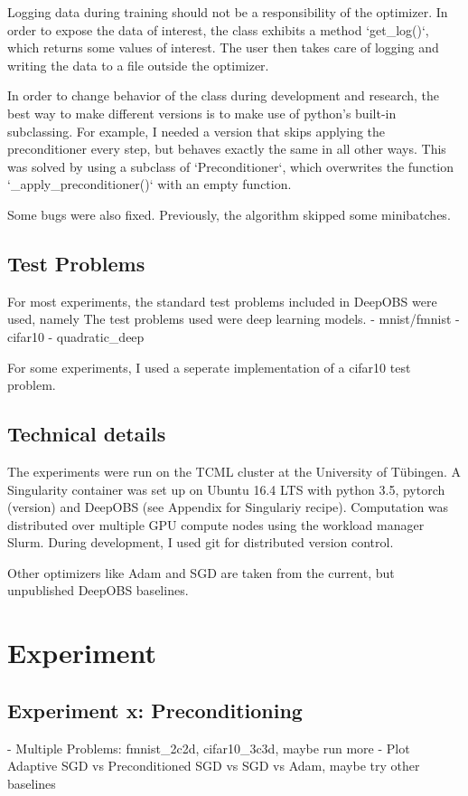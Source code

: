 \documentclass[twoside,12pt,a4paper]{report}
\begin{document}
\begin{markdown}
Logging data during training should not be a responsibility of the optimizer. In order to expose the data of interest, the class exhibits a method `get_log()`, which returns some values of interest. The user then takes care of logging and writing the data to a file outside the optimizer.

In order to change behavior of the class during development and research, the best way to make different versions is to make use of python's built-in subclassing. For example, I needed a version that skips applying the preconditioner every step, but behaves exactly the same in all other ways. This was solved by using a subclass of `Preconditioner`, which overwrites the function `_apply_preconditioner()` with an empty function.

Some bugs were also fixed. Previously, the algorithm skipped some minibatches.
\end{markdown}


\section{Test Problems}
For most experiments, the standard test problems included in DeepOBS were used, namely
The test problems used were deep learning models.
- mnist/fmnist
- cifar10
- quadratic\_deep

For some experiments, I used a seperate implementation of a cifar10 test problem.

\section{Technical details}
The experiments were run on the TCML cluster at the University of Tübingen.
A Singularity container was set up on Ubuntu 16.4 LTS with python 3.5, pytorch (version) and DeepOBS (see Appendix for Singulariy recipe).
Computation was distributed over multiple GPU compute nodes using the workload manager Slurm.
During development, I used git for distributed version control.

Other optimizers like Adam and SGD are taken from the current, but unpublished DeepOBS baselines.



\chapter{Experiment}
\section{Experiment x: Preconditioning}
- Multiple Problems: fmnist\_2c2d, cifar10\_3c3d, maybe run more
- Plot Adaptive SGD vs Preconditioned SGD vs SGD vs Adam, maybe try other baselines
\end{document}
